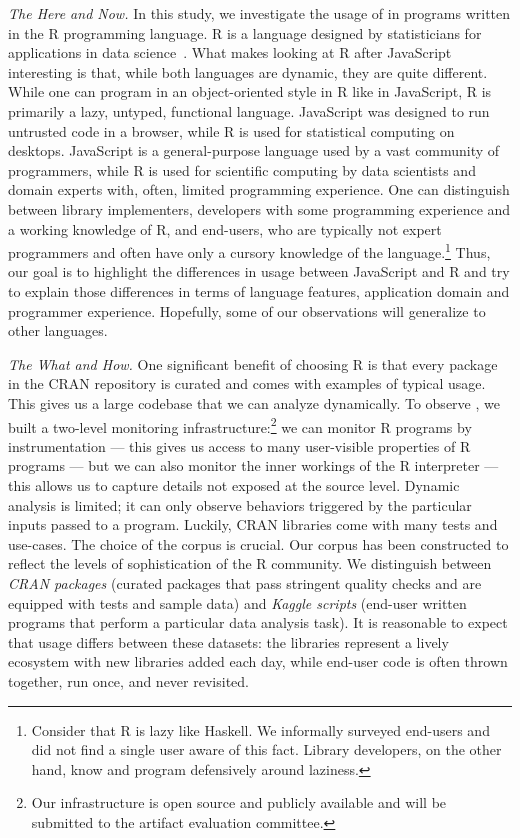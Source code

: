 \documentclass[review,screen,acmsmall,anonymous=true]{acmart}
\begin{document}
\vspace{2mm}\noindent\emph{The Here and Now.} In this study, we investigate the
usage of \eval in programs written in the R programming language. R is a language
designed by statisticians for applications in data science~\cite{r,R96}. What
makes looking at R after JavaScript interesting is that, while both languages
are dynamic, they are quite different. While one can program in an
object-oriented style in R like in JavaScript, R is primarily a lazy, untyped,
functional language. JavaScript was designed to run untrusted code in a browser,
while R is used for statistical computing on desktops. JavaScript is a general-purpose language used by a vast community of programmers, while R is used for
scientific computing by data scientists and domain experts with, often, limited
programming experience. One can distinguish between library implementers,
developers with some programming experience and a working knowledge of R, and
end-users, who are typically not expert programmers and often have only a
cursory knowledge of the language.\footnote{Consider that R is lazy like
Haskell. We informally surveyed end-users and did not find a single user aware
of this fact. Library developers, on the other hand, know and program
defensively around laziness.} Thus, our goal is to highlight the differences in
usage between JavaScript and R and try to explain those differences in terms of
language features, application domain and programmer experience. Hopefully, some
of our observations will generalize to other languages.

\vspace{2mm}\noindent\emph{The What and How.} One significant benefit of
choosing R is that every package in the CRAN repository is curated and comes
with examples of typical usage. This gives us a large codebase that we can
analyze dynamically. To observe \eval, we built a two-level monitoring
infrastructure:\footnote{Our infrastructure is open source and publicly
available and  will be submitted to the artifact evaluation committee. } we can
monitor R programs by instrumentation --- this gives us access to many
user-visible properties of R programs --- but we can also monitor the
inner workings of the R interpreter --- this allows us to capture details not
exposed at the source level. Dynamic analysis is limited; it can only observe
behaviors triggered by the particular inputs passed to a program. Luckily, CRAN
libraries come with many tests and use-cases. The choice of the corpus is crucial.
Our corpus has been constructed to reflect the levels of sophistication of the R
community. We distinguish between \emph{CRAN packages} (\CranPackages curated
packages that pass stringent quality checks and are equipped with tests and
sample data) and \emph{Kaggle scripts} (\KaggleUnique end-user written programs
that perform a particular data analysis task). It is reasonable to expect that
\eval usage differs between these datasets: the libraries represent a lively
ecosystem with new libraries added each day, while end-user code is often thrown
together, run once, and never revisited.
\end{document}
